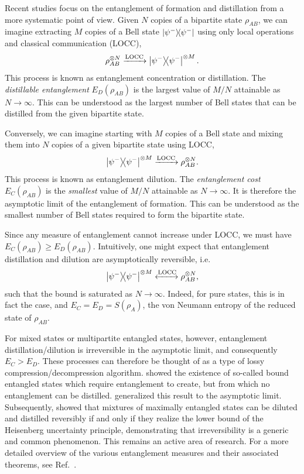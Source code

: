 \documentclass[12pt]{article}
\begin{document}
\begin{appendices}
Recent studies focus on the entanglement of formation and distillation from a more systematic point of view. Given $N$ copies of a bipartite state $\rho_{AB}$, we can imagine extracting $M$ copies of a Bell state $\ketbra{\psi^-}$ using only local operations and classical communication (LOCC),
\[\rho_{AB}^{\otimes N} \xrightarrow{\text{LOCC}} \ketbra{\psi^-}^{\otimes M}.\]
This process is known as entanglement concentration or distillation. The \emph{distillable entanglement} $E_D(\rho_{AB})$ is the largest value of $M/N$ attainable as $N \rightarrow \infty$. This can be understood as the largest number of Bell states that can be distilled from the given bipartite state.

Conversely, we can imagine starting with $M$ copies of a Bell state and mixing them into $N$ copies of a given bipartite state using LOCC,
\[\ketbra{\psi^-}^{\otimes M} \xrightarrow{\text{LOCC}} \rho_{AB}^{\otimes N}.\]
This process is known as entanglement dilution. The \emph{entanglement cost} $E_C(\rho_{AB})$ is the \emph{smallest} value of $M/N$ attainable as $N \rightarrow \infty$. It is therefore the asymptotic limit of the entanglement of formation. This can be understood as the smallest number of Bell states required to form the bipartite state.

Since any measure of entanglement cannot increase under LOCC, we must have $E_C(\rho_{AB}) \geq E_D(\rho_{AB})$. Intuitively, one might expect that entanglement distillation and dilution are asymptotically reversible, i.e.
\[\ketbra{\psi^-}^{\otimes M} \xleftrightarrow{\text{LOCC}} \rho_{AB}^{\otimes N},\]
such that the bound is saturated as $N \rightarrow \infty$. Indeed, for pure states, this is in fact the case, and $E_C = E_D = S(\rho_A)$, the von Neumann entropy of the reduced state of $\rho_{AB}$.

For mixed states or multipartite entangled states, however, entanglement distillation/dilution is irreversible in the asymptotic limit, and consequently $E_C > E_D$. These processes can therefore be thought of as a type of lossy compression/decompression algorithm. \citeauthor{horodecki} showed the existence of so-called bound entangled states which require entanglement to create, but from which no entanglement can be distilled. \citeauthor{vidal} generalized this result to the asymptotic limit. Subsequently, \citeauthor{volbrecht} showed that mixtures of maximally entangled states can be diluted and distilled reversibly if and only if they realize the lower bound of the Heisenberg uncertainty principle, demonstrating that irreversibility is a generic and common phenomenon. This remains an active area of research. For a more detailed overview of the various entanglement measures and their associated theorems, see Ref.~\cite{entanglement-review}.



\end{appendices}
\end{document}
